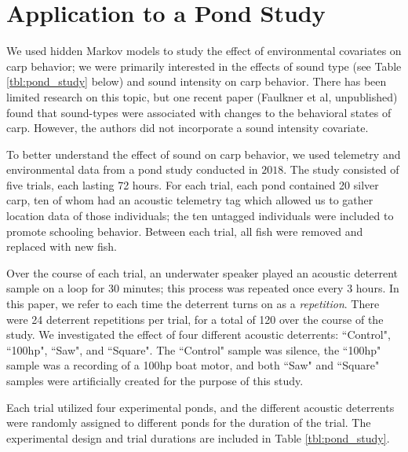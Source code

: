 \documentclass[12pt]{article}
\begin{document}
	\section{Application to a Pond Study} \label{sec:pond_study}
		
	We used hidden Markov models to study the effect of environmental covariates on carp behavior; we were primarily interested in the effects of sound type (see Table \ref{tbl:pond_study} below) and sound intensity on carp behavior. There has been limited research on this topic, but one recent paper (Faulkner et al, unpublished) found that sound-types were associated with changes to the behavioral states of carp. However, the authors did not incorporate a sound intensity covariate.
	
	To better understand the effect of sound on carp behavior, we used telemetry and environmental data from a pond study conducted in $2018$. The study consisted of five trials, each lasting 72 hours. For each trial, each pond contained 20 silver carp, ten of whom had an acoustic telemetry tag which allowed us to gather location data of those individuals; the ten untagged individuals were included to promote schooling behavior. Between each trial, all fish were removed and replaced with new fish.
	
	Over the course of each trial, an underwater speaker played an acoustic deterrent sample on a loop for 30 minutes; this process was repeated once every 3 hours. In this paper, we refer to each time the deterrent turns on as a \emph{repetition}. There were 24 deterrent repetitions per trial, for a total of 120 over the course of the study. We investigated the effect of four different acoustic deterrents: ``Control", ``100hp", ``Saw", and ``Square". The ``Control" sample was silence, the ``100hp" sample was a recording of a 100hp boat motor, and both ``Saw" and ``Square" samples were artificially created for the purpose of this study.
	
	Each trial utilized four experimental ponds, and the different acoustic deterrents were randomly assigned to different ponds for the duration of the trial. The experimental design and trial durations are included in Table \ref{tbl:pond_study}.
	
\end{document}
